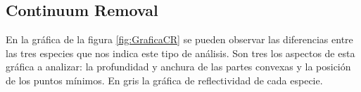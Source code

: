 \subsection{Continuum Removal}
En la gráfica de la figura \ref{fig:GraficaCR} se pueden observar las diferencias entre las tres especies que nos indica este tipo de análisis. Son tres los aspectos de esta gráfica a analizar: la profundidad y anchura de las partes convexas y la posición de los puntos mínimos. En gris la gráfica de reflectividad de cada especie.\Sep


